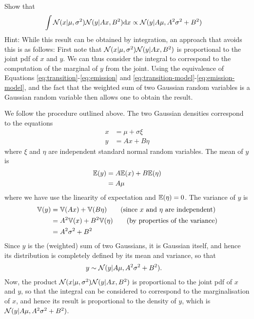 \begin{exenumerate}
  
\item Show that
\begin{align}
  \int \mathcal{N}(x | \mu, \sigma^2) \mathcal{N}(y | Ax, B^2) \mathrm{d} x & \propto \mathcal{N}(y | A \mu, A^2 \sigma^2 + B^2) \label{eq:Gaussian-int}
\end{align} 
Hint: While this result can be obtained by integration, an approach that avoids this is as follows: First note that $\mathcal{N}(x | \mu, \sigma^2) \mathcal{N}(y | Ax, B^2)$ is proportional to the joint pdf of $x$ and $y$. We can thus consider the integral to correspond to the computation of the marginal of $y$ from the joint. Using the equivalence of Equations \eqref{eq:transition}-\eqref{eq:emission} and \eqref{eq:transition-model}-\eqref{eq:emission-model}, and the fact that the weighted sum of two Gaussian random variables is a Gaussian random variable then allows one to obtain the result.
\begin{solution}
We follow the procedure outlined above. The two Gaussian densities correspond to the equations
    \begin{align}
      x & = \mu + \sigma \xi\\
      y &= A x + B \eta
    \end{align}
    where $\xi$ and $\eta$ are independent standard normal random variables. The mean of $y$ is
    \begin{align}
      \mathbb{E}(y) & = A \mathbb{E}(x) + B \mathbb{E}(\eta)\\
      & = A \mu
    \end{align}
    where we have use the linearity of expectation and $\mathbb{E}(\eta)=0$. The variance of $y$ is
    \begin{align}
      \mathbb{V}(y) & = \mathbb{V}(A x) + \mathbb{V} (B \eta) \quad \quad \text{(since $x$ and $\eta$ are independent)}\\
      & = A^2 \mathbb{V}(x) + B^2 \mathbb{V}(\eta) \quad \quad \text{(by properties of the variance)}\\
      & = A^2 \sigma^2 + B^2
    \end{align}
    Since $y$ is the (weighted) sum of two Gaussians, it is Gaussian
    itself, and hence its distribution is completely defined by its
    mean and variance, so that
    \begin{align}
      y & \sim \mathcal{N}(y | A \mu, A^2 \sigma^2+B^2).
    \end{align}
    Now, the product $\mathcal{N}(x | \mu, \sigma^2) \mathcal{N}(y | Ax, B^2)$ is proportional to the joint pdf of $x$ and $y$, so that the integral can be considered to correspond to the marginalisation of $x$, and hence its result is proportional to the density of $y$, which is $\mathcal{N}(y | A \mu, A^2 \sigma^2+B^2)$.
  \end{solution}
  

\end{exenumerate}
